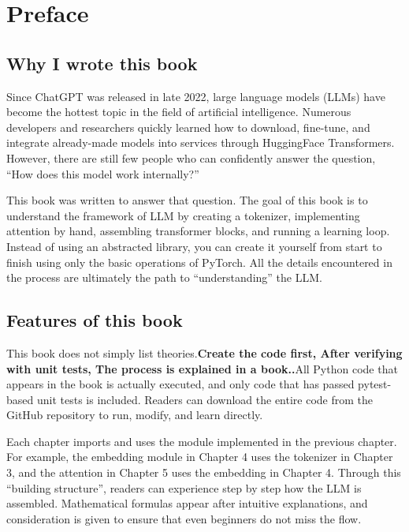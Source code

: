 
\chapter*{Preface}

\section*{Why I wrote this book}

Since ChatGPT was released in late 2022, large language models (LLMs) have become the hottest topic in the field of artificial intelligence. Numerous developers and researchers quickly learned how to download, fine-tune, and integrate already-made models into services through HuggingFace Transformers. However, there are still few people who can confidently answer the question, ``How does this model work internally?''

This book was written to answer that question. The goal of this book is to understand the framework of LLM by creating a tokenizer, implementing attention by hand, assembling transformer blocks, and running a learning loop. Instead of using an abstracted library, you can create it yourself from start to finish using only the basic operations of PyTorch. All the details encountered in the process are ultimately the path to ``understanding'' the LLM.

\section*{Features of this book}

This book does not simply list theories.\textbf{Create the code first, After verifying with unit tests, The process is explained in a book..}All Python code that appears in the book is actually executed, and only code that has passed pytest-based unit tests is included. Readers can download the entire code from the GitHub repository to run, modify, and learn directly.

Each chapter imports and uses the module implemented in the previous chapter. For example, the embedding module in Chapter 4 uses the tokenizer in Chapter 3, and the attention in Chapter 5 uses the embedding in Chapter 4. Through this ``building structure'', readers can experience step by step how the LLM is assembled. Mathematical formulas appear after intuitive explanations, and consideration is given to ensure that even beginners do not miss the flow.

